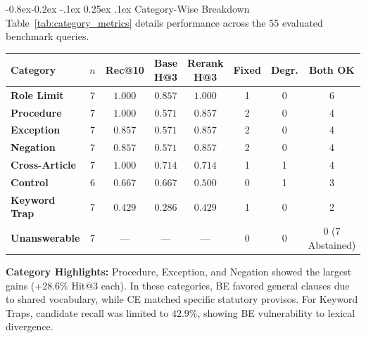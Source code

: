 \documentclass[11pt,a4paper]{article}
\makeatletter
\providecommand{\toprule}{\hline\hline}
\providecommand{\midrule}{\hline}
\providecommand{\bottomrule}{\hline\hline}
\newcommand{\captionof}[2]{%
  \def\@captype{#1}%
  \caption{#2}%
}
\renewcommand\subsection{\@startsection{subsection}{2}{\z@}%
  {-0.8ex\@plus -0.2ex \@minus -.1ex}%
  {0.25ex \@plus .1ex}%
  {\normalfont\normalsize\bfseries\color{primaryblue}}}
\newenvironment{tightcenter}{%
  \setlength\topsep{1.2pt}%
  \setlength\parskip{0pt}%
  \begin{center}%
}{%
  \end{center}%
}
\makeatother
\begin{document}
\clearpage

\subsection{Category-Wise Breakdown}
Table~\ref{tab:category_metrics} details performance across the 55 evaluated benchmark queries.

\begin{tightcenter}
\footnotesize
\setlength{\tabcolsep}{4pt}
\renewcommand{\arraystretch}{0.94}
\begin{tabular}{lccccccc}
\toprule
\textbf{Category} & $n$ & \textbf{Rec@10} & \textbf{Base H@3} & \textbf{Rerank H@3} & \textbf{Fixed} & \textbf{Degr.} & \textbf{Both OK} \\
\midrule
\textbf{Role Limit} & 7 & $1.000$ & $0.857$ & $\mathbf{1.000}$ & 1 & 0 & 6 \\
\textbf{Procedure} & 7 & $1.000$ & $0.571$ & $\mathbf{0.857}$ & 2 & 0 & 4 \\
\textbf{Exception} & 7 & $0.857$ & $0.571$ & $\mathbf{0.857}$ & 2 & 0 & 4 \\
\textbf{Negation} & 7 & $0.857$ & $0.571$ & $\mathbf{0.857}$ & 2 & 0 & 4 \\
\textbf{Cross-Article} & 7 & $1.000$ & $0.714$ & $0.714$ & 1 & 1 & 4 \\
\textbf{Control} & 6 & $0.667$ & $0.667$ & $0.500$ & 0 & 1 & 3 \\
\textbf{Keyword Trap} & 7 & $0.429$ & $0.286$ & $\mathbf{0.429}$ & 1 & 0 & 2 \\
\textbf{Unanswerable} & 7 & --- & --- & --- & 0 & 0 & 0 (7 Abstained) \\
\bottomrule
\end{tabular}
\vspace{0.10em}
\captionof{table}{Retrieval performance breakdown by category ($n=55$ evaluated queries).}
\label{tab:category_metrics}
\end{tightcenter}

\textbf{Category Highlights:} Procedure, Exception, and Negation showed the largest gains (+28.6\% Hit@3 each). In these categories, BE favored general clauses due to shared vocabulary, while CE matched specific statutory provisos. For Keyword Traps, candidate recall was limited to $42.9\%$, showing BE vulnerability to lexical divergence.
\end{document}
